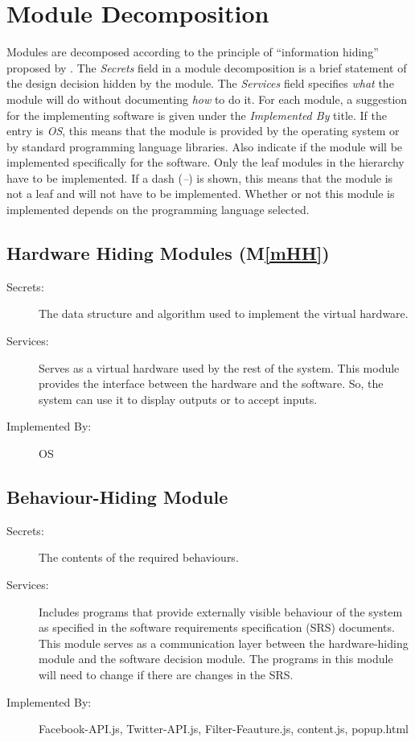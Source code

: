 \documentclass[12pt, titlepage]{article}
\newcommand{\mref}[1]{M\ref{#1}}
\begin{document}
\section{Module Decomposition} \label{SecMD}
Modules are decomposed according to the principle of ``information hiding''
proposed by \citet{ParnasEtAl1984}. The \emph{Secrets} field in a module
decomposition is a brief statement of the design decision hidden by the
module. The \emph{Services} field specifies \emph{what} the module will do
without documenting \emph{how} to do it. For each module, a suggestion for the
implementing software is given under the \emph{Implemented By} title. If the
entry is \emph{OS}, this means that the module is provided by the operating
system or by standard programming language libraries.  Also indicate if the
module will be implemented specifically for the software.
Only the leaf modules in the
hierarchy have to be implemented. If a dash (\emph{--}) is shown, this means
that the module is not a leaf and will not have to be implemented. Whether or
not this module is implemented depends on the programming language
selected.
\subsection{Hardware Hiding Modules (\mref{mHH})}
\begin{description}
\item[Secrets:]The data structure and algorithm used to implement the virtual
  hardware.
\item[Services:]Serves as a virtual hardware used by the rest of the
  system. This module provides the interface between the hardware and the
  software. So, the system can use it to display outputs or to accept inputs.
\item[Implemented By:] OS
\end{description}
\subsection{Behaviour-Hiding Module}
\begin{description}
\item[Secrets:]The contents of the required behaviours.
\item[Services:]Includes programs that provide externally visible behaviour of
  the system as specified in the software requirements specification (SRS)
  documents. This module serves as a communication layer between the
  hardware-hiding module and the software decision module. The programs in this
  module will need to change if there are changes in the SRS.
\item[Implemented By:] Facebook-API.js, Twitter-API.js, Filter-Feauture.js, content.js, popup.html
\end{description}
\end{document}
